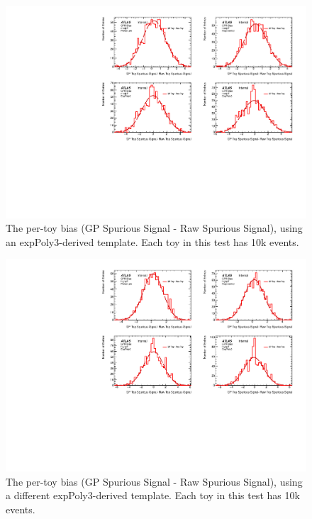 \begin{figure} 
\begin{center}
  \includegraphics[width=\textwidth]{figures/background/gpr/validation/nominal/ToyTest_FitSigBiases_medpT_10k_noSig}   
\caption{The per-toy bias (GP Spurious Signal - Raw Spurious Signal), using an expPoly3-derived template. Each toy in this test has 10k events.}
\label{fig:bias_medpt_10k_noSig}
\end{center}
\end{figure}

\begin{figure} 
\begin{center}
  \includegraphics[width=\textwidth]{figures/background/gpr/validation/nominal/ToyTest_FitSigBiases_highpT_10k_noSig}   
\caption{The per-toy bias (GP Spurious Signal - Raw Spurious Signal), using a different expPoly3-derived template. Each toy in this test has 10k events.}
\label{fig:bias_highpt_10k_noSig}
\end{center}
\end{figure}


